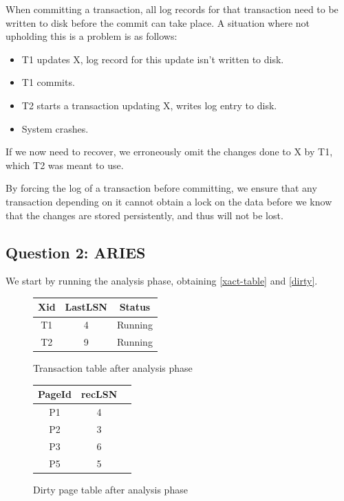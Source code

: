 \documentclass[11pt,a4paper]{article}
\begin{document}
When committing a transaction, all log records for that transaction need to be
written to disk before the commit can take place. A situation where not upholding
this is a problem is as follows:

\begin{itemize}
    \item T1 updates X, log record for this update isn't written to disk.
    \item T1 commits.
    \item T2 starts a transaction updating X, writes log entry to disk.
    \item System crashes.
\end{itemize}

If we now need to recover, we erroneously omit the changes done to X by T1,
which T2 was meant to use.

By forcing the log of a transaction before committing, we ensure that any
transaction depending on it cannot obtain a lock on the data before we know
that the changes are stored persistently, and thus will not be lost.

\subsection{Question 2: ARIES}
We start by running the analysis phase, obtaining \autoref{xact-table} and \autoref{dirty}.

\begin{figure}[h!]
    \centering
\begin{tabular}{|c|c|c|}
    \hline
    Xid & LastLSN & Status \\
    \hline
    T1  & 4       & Running \\
    T2  & 9       & Running \\
    \hline
\end{tabular}
\caption{Transaction table after analysis phase}
\label{xact-table}
\end{figure}

\begin{figure}[h!]
    \centering
\begin{tabular}{|c|c|c|}
    \hline
    PageId & recLSN \\
    \hline
    P1     & 4 \\
    P2     & 3 \\
    P3     & 6 \\
    P5     & 5 \\
    \hline
\end{tabular}
\caption{Dirty page table after analysis phase}
\label{dirty}
\end{figure}
\end{document}
